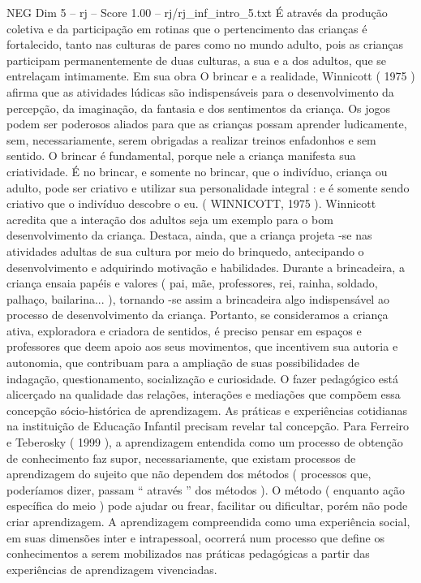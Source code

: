 \begin{textsample}{NEG Dim 5 – rj – Score 1.00 – rj/rj\_inf\_intro\_5.txt}
É através da produção coletiva e da participação em rotinas que o pertencimento das crianças é fortalecido, tanto nas culturas de pares como no mundo adulto, pois as crianças participam permanentemente de duas culturas, a sua e a dos adultos, que se entrelaçam intimamente.
Em sua obra O brincar e a realidade, Winnicott ( 1975 ) afirma que as atividades lúdicas são indispensáveis para o desenvolvimento da percepção, da imaginação, da fantasia e dos sentimentos da criança.
Os jogos podem ser poderosos aliados para que as crianças possam aprender ludicamente, sem, necessariamente, serem obrigadas a realizar treinos enfadonhos e sem sentido.
O brincar é fundamental, porque nele a criança manifesta sua criatividade.
É no brincar, e somente no brincar, que o indivíduo, criança ou adulto, pode ser criativo e utilizar sua personalidade integral : e é somente sendo criativo que o indivíduo descobre o eu. ( WINNICOTT, 1975 ).
Winnicott acredita que a interação dos adultos seja um exemplo para o bom desenvolvimento da criança.
Destaca, ainda, que a criança projeta -se nas atividades adultas de sua cultura por meio do brinquedo, antecipando o desenvolvimento e adquirindo motivação e habilidades.
Durante a brincadeira, a criança ensaia papéis e valores ( pai, mãe, professores, rei, rainha, soldado, palhaço, bailarina... ), tornando -se assim a brincadeira algo indispensável ao processo de desenvolvimento da criança.
Portanto, se consideramos a criança ativa, exploradora e criadora de sentidos, é preciso pensar em espaços e professores que deem apoio aos seus movimentos, que incentivem sua autoria e autonomia, que contribuam para a ampliação de suas possibilidades de indagação, questionamento, socialização e curiosidade.
O fazer pedagógico está alicerçado na qualidade das relações, interações e mediações que compõem essa concepção sócio-histórica de aprendizagem.
As práticas e experiências cotidianas na instituição de Educação Infantil precisam revelar tal concepção.
Para Ferreiro e Teberosky ( 1999 ), a aprendizagem entendida como um processo de obtenção de conhecimento faz supor, necessariamente, que existam processos de aprendizagem do sujeito que não dependem dos métodos ( processos que, poderíamos dizer, passam “ através ” dos métodos ).
O método ( enquanto ação específica do meio ) pode ajudar ou frear, facilitar ou dificultar, porém não pode criar aprendizagem.
A aprendizagem compreendida como uma experiência social, em suas dimensões inter e intrapessoal, ocorrerá num processo que define os conhecimentos a serem mobilizados nas práticas pedagógicas a partir das experiências de aprendizagem vivenciadas.

\end{textsample}
